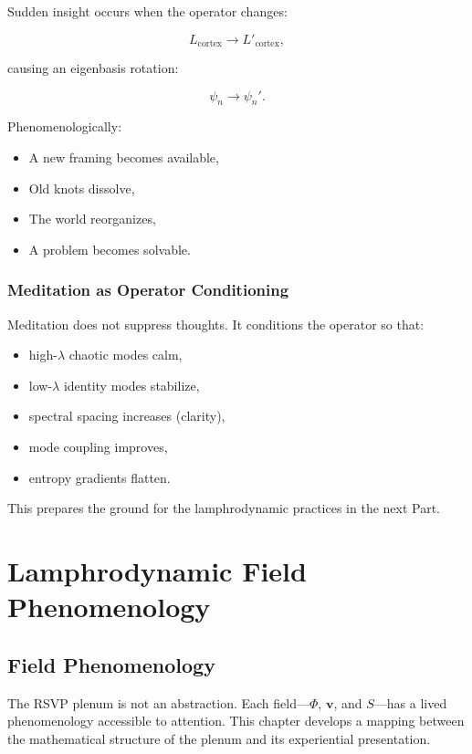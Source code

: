 \documentclass[12pt]{article}
\begin{document}
Sudden insight occurs when the operator changes:

\[
L_{\text{cortex}} \to L'_{\text{cortex}},
\]

causing an eigenbasis rotation:

\[
\psi_n \to \psi_n'.
\]

Phenomenologically:

\begin{itemize}
    \item A new framing becomes available,
    \item Old knots dissolve,
    \item The world reorganizes,
    \item A problem becomes solvable.
\end{itemize}

\section{Meditation as Operator Conditioning}

Meditation does not suppress thoughts.  
It conditions the operator so that:

\begin{itemize}
    \item high-$\lambda$ chaotic modes calm,
    \item low-$\lambda$ identity modes stabilize,
    \item spectral spacing increases (clarity),
    \item mode coupling improves,
    \item entropy gradients flatten.
\end{itemize}

This prepares the ground for the lamphrodynamic practices in the next Part.


\part{Lamphrodynamic Field Phenomenology}

\chapter{Field Phenomenology}

The RSVP plenum is not an abstraction.  
Each field—$\Phi$, $\mathbf{v}$, and $S$—has a lived phenomenology accessible to attention.
This chapter develops a mapping between the mathematical structure of the plenum
and its experiential presentation.
\end{document}
